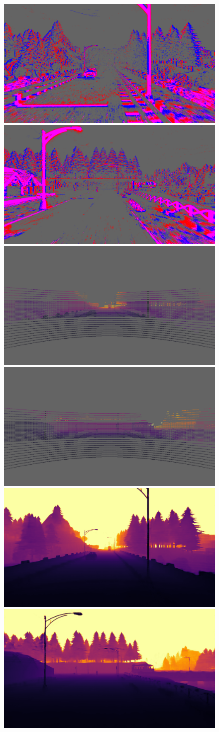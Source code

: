 \begin{figure}
  \centering
  \includegraphics[width=0.465\linewidth]{mainmatter/figures/b_depth_conv/sled_dense_cmp_additional/evts000750_lightgray_fixed.png}
  \includegraphics[width=0.465\linewidth]{mainmatter/figures/b_depth_conv/sled_dense_cmp_additional/evts000994_lightgray_fixed.png}
  \includegraphics[width=0.465\linewidth]{mainmatter/figures/b_depth_conv/sled_dense_cmp_additional/lidar000750_lightgray_fixed.png}
  \includegraphics[width=0.465\linewidth]{mainmatter/figures/b_depth_conv/sled_dense_cmp_additional/lidar000994_lightgray_fixed.png}
  \includegraphics[width=0.465\linewidth]{mainmatter/figures/b_depth_conv/sled_dense_cmp_additional/prev000750.png}
  \includegraphics[width=0.465\linewidth]{mainmatter/figures/b_depth_conv/sled_dense_cmp_additional/prev000994.png}

\end{figure}
